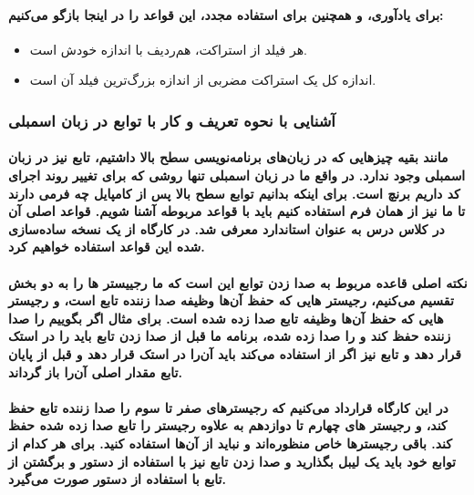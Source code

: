 \paragraph{برای یادآوری، و همچنین برای استفاده مجدد، این قواعد را در اینجا بازگو می‌کنیم:}

\begin{itemize}
    \item هر فیلد از استراکت، هم‌ردیف با اندازه خودش است.
    \item اندازه کل یک استراکت مضربی از اندازه بزرگ‌ترین فیلد آن است.
    
\end{itemize}

\subsubsection{آشنایی با نحوه تعریف و کار با توابع در زبان اسمبلی}

\paragraph{مانند بقیه چیزهایی که در زبان‌های برنامه‌نویسی سطح بالا داشتیم، تابع نیز در زبان اسمبلی وجود ندارد. در واقع ما در زبان اسمبلی تنها روشی که برای تغییر روند اجرای کد داریم برنچ است. برای اینکه بدانیم توابع سطح بالا پس از کامپایل چه فرمی دارند تا ما نیز از همان فرم استفاده کنیم باید با قواعد مربوطه آشنا شویم. قواعد اصلی آن در کلاس درس به عنوان استاندارد  معرفی شد. در کارگاه از یک نسخه ساده‌سازی شده این قواعد استفاده خواهیم کرد.}

\paragraph{
نکته اصلی قاعده مربوط به صدا زدن توابع این است که ما رجییستر ها را به دو بخش تقسیم می‌کنیم، رجیستر هایی که حفظ آن‌ها وظیفه صدا زننده تابع است، و رجیستر هایی که حفظ آن‌ها وظیفه تابع صدا زده شده است. برای مثال اگر بگوییم  را صدا زننده حفظ کند و  را صدا زده شده، برنامه ما قبل از صدا زدن تابع باید  را در استک قرار دهد و تابع نیز اگر از  استفاده می‌کند باید آن‌را در استک قرار دهد و قبل از پایان تابع مقدار اصلی آن‌را باز گرداند.
}

\paragraph{در این کارگاه قرارداد می‌کنیم که رجیسترهای صفر تا سوم را صدا زننده تابع حفظ کند، و رجیستر های چهارم تا دوازدهم به علاوه رجیستر  را تابع صدا زده شده حفظ کند. باقی رجیسترها خاص منظوره‌اند و نباید از آن‌ها استفاده کنید. برای هر کدام از توابع خود باید یک لیبل بگذارید و صدا زدن تابع نیز با استفاده از دستور  و برگشتن از تابع با استفاده از دستور  صورت می‌گیرد.}

